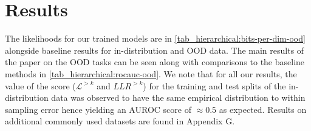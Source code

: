 {\section{Results}

The likelihoods for our trained models are in \cref{tab_hierarchical:bits-per-dim-ood} alongside baseline results for in-distribution and OOD data.
The main results of the paper on the OOD tasks can be seen along with comparisons to the baseline methods in \cref{tab_hierarchical:rocauc-ood}.
We note that for all our results, the value of the score ($\mathcal{L}^{>k}$ and $LLR^{>k}$) for the training and test splits of the in-distribution data was observed to have the same empirical distribution to within sampling error hence yielding an AUROC score of $\approx0.5$ as expected.
Results on additional commonly used datasets are found in Appendix G.


}
